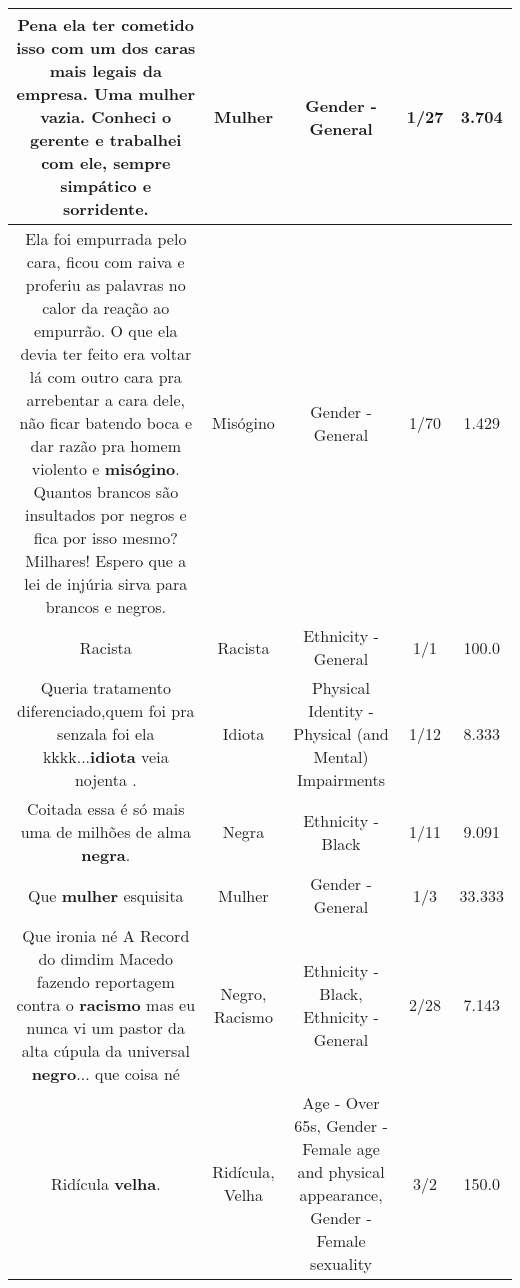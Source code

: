 \documentclass[11pt]{article}
\newlength\mylength
\begin{document}
\begin{center}
\begin{longtable}{|C{.65\mylength}|C{.30\mylength}|C{.12\mylength}|C{.12\mylength}|C{.12\mylength}|}
  \small Pena ela ter cometido isso com um dos caras mais legais da empresa. Uma \textbf{mulher} vazia. Conheci o gerente e trabalhei com ele, sempre simpático e sorridente.\normalsize   & Mulher & Gender - General & 1/27 & 3.704 \\  \hline
  \small Ela foi empurrada pelo cara, ficou com raiva e proferiu as palavras no calor da reação ao empurrão. O que ela devia ter feito era voltar lá com outro cara pra arrebentar a cara dele, não  ficar batendo boca e dar razão pra homem violento e \textbf{misógino}. Quantos brancos são insultados por negros e fica por isso mesmo?  Milhares! Espero que a lei de injúria sirva para brancos e negros.\normalsize   & Misógino & Gender - General & 1/70 & 1.429 \\  \hline
  \small Racista\normalsize   & Racista & Ethnicity - General & 1/1 & 100.0 \\  \hline
  \small Queria tratamento diferenciado,quem foi pra senzala foi ela kkkk...\textbf{idiota} veia nojenta .\normalsize   & Idiota & Physical Identity - Physical (and Mental) Impairments & 1/12 & 8.333 \\  \hline
  \small Coitada essa é só mais uma de milhões de alma \textbf{negra}.\normalsize   & Negra & Ethnicity - Black & 1/11 & 9.091 \\  \hline
  \small Que \textbf{mulher} esquisita\normalsize   & Mulher & Gender - General & 1/3 & 33.333 \\  \hline
  \small Que ironia né A Record do dimdim Macedo fazendo reportagem contra o \textbf{racismo} mas eu nunca vi um pastor da alta cúpula da universal \textbf{negro}... que coisa né\normalsize   & Negro, Racismo & Ethnicity - Black, Ethnicity - General & 2/28 & 7.143 \\  \hline
  \small Ridícula \textbf{v\textbf{elha}}.\normalsize   & Ridícula, Velha & Age - Over 65s, Gender - Female age and physical appearance, Gender - Female sexuality & 3/2 & 150.0 \\  \hline

\end{longtable}
\end{center}
\end{document}

